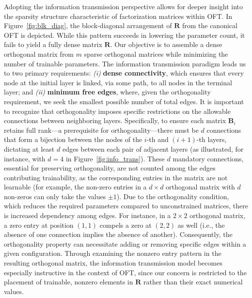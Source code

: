 Adopting the information transmission perspective allows for deeper insight into the sparsity structure characteristic of factorization matrices within OFT. In Figure~\ref{fig:blk_diag}, the block-diagonal arrangement of $\bm{R}$ from the canonical OFT is depicted. While this pattern succeeds in lowering the parameter count, it fails to yield a fully dense matrix $\bm{R}$. Our objective is to assemble a dense orthogonal matrix from $m$ sparse orthogonal matrices while minimizing the number of trainable parameters. The information transmission paradigm leads us to two primary requirements: \emph{(i)} \textbf{dense connectivity}, which ensures that every node at the initial layer is linked, via some path, to all nodes in the terminal layer; and \emph{(ii)} \textbf{minimum free edges}, where, given the orthogonality requirement, we seek the smallest possible number of total edges. It is important to recognize that orthogonality imposes specific restrictions on the allowable connections between neighboring layers. Specifically, to ensure each matrix $\bm{B}_i$ retains full rank—a prerequisite for orthogonality—there must be $d$ connections that form a bijection between the nodes of the $i$-th and $(i+1)$-th layers, dictating at least $d$ edges between each pair of adjacent layers (as illustrated, for instance, with $d=4$ in Figure~\ref{fig:info_trans}). These $d$ mandatory connections, essential for preserving orthogonality, are not counted among the edges contributing trainability, as the corresponding entries in the matrix are not learnable (for example, the non-zero entries in a $d \times d$ orthogonal matrix with $d$ non-zeros can only take the values $\pm 1$). Due to the orthogonality condition, which reduces the required parameters compared to unconstrained matrices, there is increased dependency among edges. For instance, in a $2\times 2$ orthogonal matrix, a zero entry at position $(1,1)$ compels a zero at $(2,2)$ as well (i.e., the absence of one connection implies the absence of another). Consequently, the orthogonality property can necessitate adding or removing specific edges within a given configuration. Through examining the nonzero entry pattern in the resulting orthogonal matrix, the information transmission model becomes especially instructive in the context of OFT, since our concern is restricted to the placement of trainable, nonzero elements in $\bm{R}$ rather than their exact numerical values.

